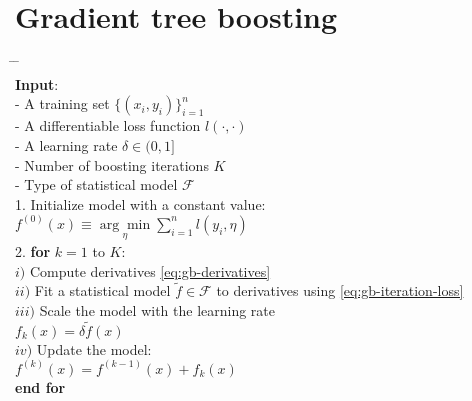 





\section{Gradient tree boosting}
\label{sec:gradient tree boosting}
\begin{algorithm*}[h!]
	\begin{tabbing}
		\hspace{2em} \= \hspace{2em} \= \hspace{2em} \= \\
		{\bfseries Input}: \\
		\> - A training set $\{(x_i, y_{i})\}_{i=1}^n$\\
		\> - A differentiable loss function $l(\cdot,\cdot)$\\
		\> - A learning rate $\delta\in(0,1]$\\
		\> - Number of boosting iterations $K$\\
		\> - Type of statistical model $\mathcal{F}$\\
		
		1. Initialize model with a constant value:\\
		\>	$f^{(0)}(x) \equiv \underset{\eta}{\arg\min} \sum_{i=1}^n l(y_i, \eta)$\\
		
		2. {\bfseries for} $k = 1$ to $K$:\\
		
		\>	$i)$ Compute derivatives \eqref{eq:gb-derivatives}\\
		
		\> $ii)$ Fit a statistical model $\tilde{f}\in \mathcal{F}$ to derivatives using \eqref{eq:gb-iteration-loss} \\
		
		\> $iii)$ Scale the model with the learning rate\\
		\>\> $f_k(x)= \delta \tilde{f}(x)$ \\%
		
		\>	$iv)$ Update the model:\\
		\>\>	$f^{(k)}(x) = f^{(k-1)}(x) + f_k(x)$\\
		{\bfseries end for} \\
		

\end{tabbing}
\end{algorithm*}
